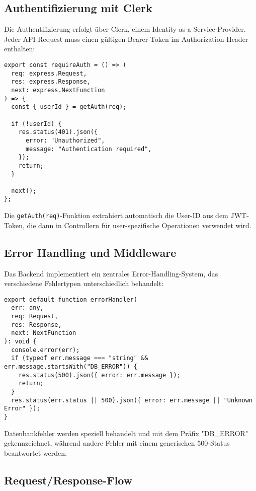 \subsection{Authentifizierung mit Clerk}

Die Authentifizierung erfolgt über Clerk, einem Identity-as-a-Service-Provider. Jeder API-Request muss einen gültigen Bearer-Token im Authorization-Header enthalten:

\begin{lstlisting}[style=typescriptstyle,caption={Authentifizierungs-Middleware}]
export const requireAuth = () => (
  req: express.Request,
  res: express.Response,
  next: express.NextFunction
) => {
  const { userId } = getAuth(req);

  if (!userId) {
    res.status(401).json({
      error: "Unauthorized",
      message: "Authentication required",
    });
    return;
  }

  next();
};
\end{lstlisting}

Die \texttt{getAuth(req)}-Funktion extrahiert automatisch die User-ID aus dem JWT-Token, die dann in Controllern für user-spezifische Operationen verwendet wird.

\subsection{Error Handling und Middleware}

Das Backend implementiert ein zentrales Error-Handling-System, das verschiedene Fehlertypen unterschiedlich behandelt:

\begin{lstlisting}[style=typescriptstyle,caption={Zentraler Error Handler}]
export default function errorHandler(
  err: any,
  req: Request,
  res: Response,
  next: NextFunction
): void {
  console.error(err);
  if (typeof err.message === "string" && err.message.startsWith("DB_ERROR")) {
    res.status(500).json({ error: err.message });
    return;
  }
  res.status(err.status || 500).json({ error: err.message || "Unknown Error" });
}
\end{lstlisting}

Datenbankfehler werden speziell behandelt und mit dem Präfix "DB\_ERROR" gekennzeichnet, während andere Fehler mit einem generischen 500-Status beantwortet werden.

\subsection{Request/Response-Flow}

